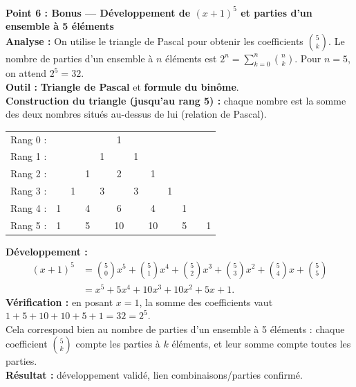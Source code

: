 \documentclass[11pt]{article}
\begin{document}
\begin{exoresolu}
\noindent \textbf{Point 6 : Bonus — Développement de $(x+1)^5$ et parties d'un ensemble à 5 éléments}\\
\textbf{Analyse :} On utilise le triangle de Pascal pour obtenir les coefficients $\binom{5}{k}$. Le nombre de parties d'un ensemble à $n$ éléments est $2^n = \sum_{k=0}^n \binom{n}{k}$. Pour $n=5$, on attend $2^5 = 32$.\\
\textbf{Outil :} \textbf{Triangle de Pascal} et \textbf{formule du binôme}.\\
\textbf{Construction du triangle (jusqu'au rang 5) :} chaque nombre est la somme des deux nombres situés au-dessus de lui (relation de Pascal).
\begin{center}
\begin{tabular}{c c c c c c c c c c cc}
Rang 0 : & & & & & 1 & & & & & \\
Rang 1 : & & & & 1 & & 1 & & & & \\
Rang 2 : & & & 1 & & 2 & & 1 & & & \\
Rang 3 : & & 1 & & 3 & & 3 & & 1 & & \\
Rang 4 : & 1 & & 4 & & 6 & & 4 & & 1 & \\
Rang 5 : & 1 & & 5 & & 10 & & 10 & & 5 & & 1
\end{tabular}
\end{center}
\textbf{Développement :}
\begin{align*}
(x+1)^5 &= \binom{5}{0}x^5 + \binom{5}{1}x^4 + \binom{5}{2}x^3 + \binom{5}{3}x^2 + \binom{5}{4}x + \binom{5}{5} \\
&= x^5 + 5x^4 + 10x^3 + 10x^2 + 5x + 1.
\end{align*}
\textbf{Vérification :} en posant $x=1$, la somme des coefficients vaut $1+5+10+10+5+1 = 32 = 2^5$.\\
Cela correspond bien au nombre de parties d'un ensemble à 5 éléments : chaque coefficient $\binom{5}{k}$ compte les parties à $k$ éléments, et leur somme compte toutes les parties.\\
\textbf{Résultat :} développement validé, lien combinaisons/parties confirmé.


\end{exoresolu}
\end{document}
